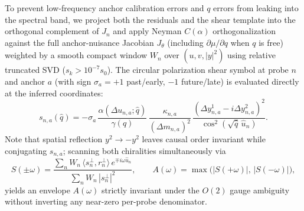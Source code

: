 \documentclass[11pt,a4paper]{article}
\begin{document}
To prevent low-frequency anchor calibration errors and $q$ errors from leaking
into the spectral band, we project both the residuals and the shear template into
the orthogonal complement of $J_n$ and apply Neyman $C(\alpha)$ orthogonalization
against the full anchor-nuisance Jacobian $J_{\theta}$ (including $\partial\mu/\partial q$
when $q$ is free) weighted by a smooth compact window $W_n$ over $(u,v,|y|^2)$
using relative truncated SVD ($s_k > 10^{-7} s_0$). The circular polarization shear
symbol at probe $n$ and anchor $a$ (with sign $\sigma_a = +1$ past/early, $-1$
future/late) is evaluated directly at the inferred coordinates:
\begin{equation}
 s_{n,a}(\hat{q}) = -\sigma_a\,\frac{\alpha(\Delta u_{n,a}; \hat{q})}{\gamma(\hat{q})}
 \,\frac{\kappa_{n,a}}{(\Delta m_{n,a})^2}\,\frac{(\Delta y^1_{n,a} - i\Delta y^2_{n,a})^2}{\cos^2(\sqrt{\hat{q}}\,\hat{u}_n)}.
 \label{eq:shear}
\end{equation}
Note that spatial reflection $y^2 \to -y^2$ leaves causal order invariant while
conjugating $s_{n,a}$; scanning both chiralities simultaneously via
\begin{equation}
 S(\pm\omega) = \frac{\sum_n W_n\,\langle s_n^\perp, r_n^\perp\rangle\,e^{\mp i\omega \hat{u}_n}}{\sum_n W_n\,|s_n^\perp|^2},
 \qquad
 A(\omega) = \max\bigl(|S(+\omega)|,\, |S(-\omega)|\bigr),
 \label{eq:score}
\end{equation}
yields an envelope $A(\omega)$ strictly invariant under the $O(2)$ gauge
ambiguity without inverting any near-zero per-probe denominator.
\end{document}
